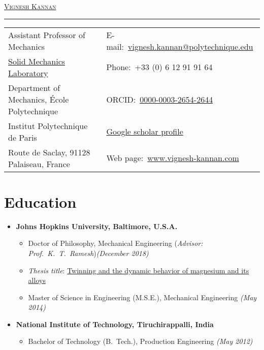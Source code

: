 \documentclass[a4paper,10pt, oneside]{article}
\begin{document}
 \thispagestyle{empty}
	
	\noindent 
	\begin{center}
		\LARGE{\textsc{\href{www.vignesh-kannan.com}{Vignesh Kannan}}} \vspace{-0.5em}
	\end{center} 
	\noindent \rule{\textwidth}{1pt}
	\begin{tabularx}{\textwidth}{@{}l X}
		Assistant Professor of Mechanics	&	\hfill	E-mail:~\href{mailto:vignesh.kannan@polytechnique.edu}{vignesh.kannan@polytechnique.edu} \\
		\href{https://portail.polytechnique.edu/lms/fr/accueil}{Solid Mechanics Laboratory} & \hfill Phone:~+33 (0) 6 12 91 91 64 \\
		Department of Mechanics, {\'E}cole Polytechnique    &  \hfill ORCID:~\href{https://orcid.org/0000-0003-2654-2644}{0000-0003-2654-2644}\\
		Institut Polytechnique de Paris &  \hfill \href{https://scholar.google.com/citations?user=ntDAO2oAAAAJ\&hl=en\&authuser=1}{Google scholar profile}\\       
		Route de Saclay, 91128 Palaiseau, France & \hfill Web page:~\href{https://www.vignesh-kannan.com}{www.vignesh-kannan.com} \\
	\end{tabularx}
	
	\section*{Education}
	\begin{itemize}[wide, labelwidth=!, labelindent=-1em]
		\item[]\textbf{Johns Hopkins University, Baltimore, U.S.A.}  
		\begin{itemize}[wide, labelwidth=!, labelindent=-1em]
			\item[] Doctor of Philosophy, Mechanical Engineering (\textit{Advisor: Prof.~K.~T.~Ramesh})\hfill \textit{(December 2018)}
			\item[]\textit{Thesis title}: \href{https://jscholarship.library.jhu.edu/handle/1774.2/61443}{Twinning and the dynamic behavior of magnesium and its alloys} 
			\vspace*{0.5em}
			\item[] Master of Science in Engineering (M.S.E.), Mechanical Engineering \hfill \textit{(May 2014)}
		\end{itemize}
		\vspace*{0.5em}
		\item[]\textbf{National Institute of Technology, Tiruchirappalli, India}
		\begin{itemize}[wide, labelwidth=!, labelindent=-1em]
			\item[] Bachelor of Technology (B.~Tech.), Production Engineering \hfill \textit{(May 2012)} 
		\end{itemize}
	\end{itemize}
	
\end{document}
